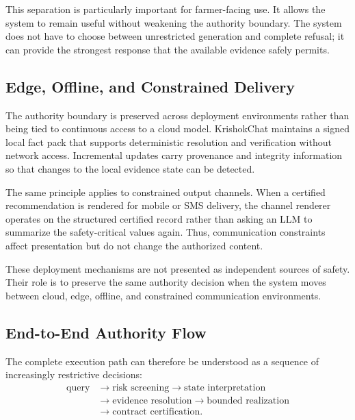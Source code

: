 \documentclass[a4paper,fleqn]{cas-dc}
\begin{document}
This separation is particularly important for farmer-facing use. It allows the system to remain useful without weakening the authority boundary. The system does not have to choose between unrestricted generation and complete refusal; it can provide the strongest response that the available evidence safely permits.

\subsection{Edge, Offline, and Constrained Delivery}

The authority boundary is preserved across deployment environments rather than being tied to continuous access to a cloud model. KrishokChat maintains a signed local fact pack that supports deterministic resolution and verification without network access. Incremental updates carry provenance and integrity information so that changes to the local evidence state can be detected.

The same principle applies to constrained output channels. When a certified recommendation is rendered for mobile or SMS delivery, the channel renderer operates on the structured certified record rather than asking an LLM to summarize the safety-critical values again. Thus, communication constraints affect presentation but do not change the authorized content.

These deployment mechanisms are not presented as independent sources of safety. Their role is to preserve the same authority decision when the system moves between cloud, edge, offline, and constrained communication environments.

\subsection{End-to-End Authority Flow}

The complete execution path can therefore be understood as a sequence of increasingly restrictive decisions:
\begin{equation}
\begin{aligned}
\text{query} &\rightarrow \text{risk screening} \rightarrow \text{state interpretation} \\
&\rightarrow \text{evidence resolution} \rightarrow \text{bounded realization} \\
&\rightarrow \text{contract certification}.
\end{aligned}
\end{equation}
\end{document}
